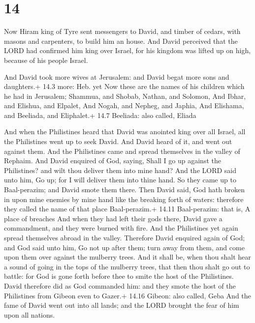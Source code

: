 \hypertarget{section-13}{%
\section{14}\label{section-13}}

 Now Hiram king of Tyre sent messengers to David, and timber
of cedars, with masons and carpenters, to build him an house.
 And David perceived that the LORD had confirmed him king
over Israel, for his kingdom was lifted up on high, because of his
people Israel.

 And David took more wives at Jerusalem: and David begat
more sons and daughters.+ 14.3 more: Heb. yet  Now these are
the names of his children which he had in Jerusalem; Shammua, and
Shobab, Nathan, and Solomon,  And Ibhar, and Elishua, and
Elpalet,  And Nogah, and Nepheg, and Japhia, 
And Elishama, and Beeliada, and Eliphalet.+ 14.7 Beeliada: also called,
Eliada

 And when the Philistines heard that David was anointed
king over all Israel, all the Philistines went up to seek David. And
David heard of it, and went out against them.  And the
Philistines came and spread themselves in the valley of Rephaim.
 And David enquired of God, saying, Shall I go up against
the Philistines? and wilt thou deliver them into mine hand? And the LORD
said unto him, Go up; for I will deliver them into thine hand.
 So they came up to Baal-perazim; and David smote them
there. Then David said, God hath broken in upon mine enemies by mine
hand like the breaking forth of waters: therefore they called the name
of that place Baal-perazim.+ 14.11 Baal-perazim: that is, A place of
breaches  And when they had left their gods there, David
gave a commandment, and they were burned with fire.  And
the Philistines yet again spread themselves abroad in the valley.
 Therefore David enquired again of God; and God said unto
him, Go not up after them; turn away from them, and come upon them over
against the mulberry trees.  And it shall be, when thou
shalt hear a sound of going in the tops of the mulberry trees, that then
thou shalt go out to battle: for God is gone forth before thee to smite
the host of the Philistines.  David therefore did as God
commanded him: and they smote the host of the Philistines from Gibeon
even to Gazer.+ 14.16 Gibeon: also called, Geba  And the
fame of David went out into all lands; and the LORD brought the fear of
him upon all nations.

